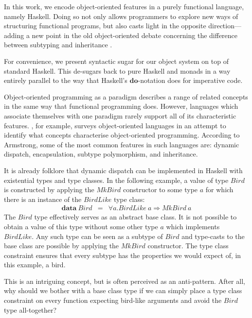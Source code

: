 In this work, we encode object-oriented features in a purely functional language, namely Haskell. Doing so not only allows programmers to explore new ways of structuring functional programs, but also casts light in the opposite direction---adding a new point in the old object-oriented debate concerning the difference between subtyping and inheritance \cite{cook1989inheritance}. 

For convenience, we present syntactic sugar for our object system on top of standard Haskell. This de-sugars back to pure Haskell and monads in a way entirely
parallel to the way that Haskell's $\mathbf{do}$-notation does for imperative code.

Object-oriented programming as a paradigm describes a range of related concepts in the same way that functional programming does. However, languages which associate themselves with one paradigm rarely support all of its characteristic features. \citet{armstrong2006quarks}, for example, surveys object-oriented languages in an attempt to identify what concepts characterise object-oriented programming. According to Armstrong, some of the most common features in such languages are: dynamic dispatch, encapsulation, subtype polymorphism, and inheritance. 

It is already folklore that dynamic dispatch can be implemented in Haskell with existential types and type classes. In the following example, a value of type $\mathit{Bird}$ is constructed by applying the $\mathit{MkBird}$ constructor to some type $a$ for which there is an instance of the $\mathit{BirdLike}$ type class:
\begin{displaymath}
\begin{array}{lcl}
\mathbf{data}~\mathit{Bird} & = & \forall a. \mathit{BirdLike}~a \Rightarrow \mathit{MkBird}~a
\end{array}
\end{displaymath}
The $\mathit{Bird}$ type effectively serves as an abstract base class. It is not possible to obtain a value of this type without some other type $a$ which implements $\mathit{BirdLike}$. Any such type can be seen as a subtype of $\mathit{Bird}$ and type-casts to the base class are possible by applying the $\mathit{MkBird}$ constructor. The type class constraint ensures that every subtype has the properties we would expect of, in this example, a bird.

This is an intriguing concept, but is often perceived as an anti-pattern. After all, why should we bother with a base class type if we can simply place a type class constraint on every function expecting bird-like arguments and avoid the $\mathit{Bird}$ type all-together?

